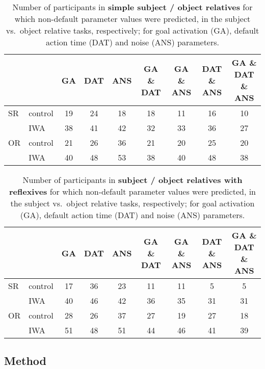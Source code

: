 \documentclass[10pt,letterpaper]{article}
\begin{document}
\begin{table*}[htpb!]
  \centering
  \begin{tabular}{llccccccc}
    ~  & ~        & GA & DAT & ANS & GA \& DAT & GA \& ANS & DAT \& ANS & GA \& DAT \& ANS\\
    \hline
    SR & control  & 19 & 24  & 18  & 18     & 11     & 16      & 10\\
    ~  & IWA      & 38 & 41  & 42  & 32     & 33     & 36      & 27\\
    \hline
    OR & control  & 21 & 26  & 36  & 21     & 20     & 25      & 20\\
    ~  & IWA      & 40 & 48  & 53  & 38     & 40     & 48      & 38\\
    \hline
  \end{tabular}
  \caption{Number of participants in \textbf{simple subject / object relatives} for which non-default parameter values were predicted, in the subject vs.\ object relative tasks, respectively; for goal activation (GA), default action time (DAT) and noise (ANS) parameters.}
  \label{table:normsettingsSO}
\end{table*}

\begin{table*}[htpb!]
  \centering
  \begin{tabular}{llccccccc}
    ~  & ~        & GA & DAT & ANS & GA \& DAT & GA \& ANS & DAT \& ANS & GA \& DAT \& ANS\\
    \hline
    SR & control  & 17 & 36  & 23  & 11        & 11        & 5          & 5\\
    ~  & IWA      & 40 & 46  & 42  & 36        & 35        & 31         & 31\\
    \hline
    OR & control  & 28 & 26  & 37  & 27        & 19        & 27         & 18\\
    ~  & IWA      & 51 & 48  & 51  & 44        & 46        & 41         & 39\\
    \hline
  \end{tabular}
  \caption{Number of participants in \textbf{subject / object relatives with reflexives} for which non-default parameter values were predicted, in the subject vs.\ object relative tasks, respectively; for goal activation (GA), default action time (DAT) and noise (ANS) parameters.}
  \label{table:normsettingsSOREF}
\end{table*}
\subsection{Method}
\end{document}
